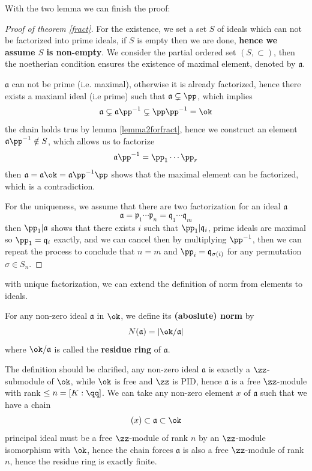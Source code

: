 With the two lemma we can finish the proof:
\begin{proof}[Proof of theorem \ref{fract}]
    For the existence, we set a set \(S\) of ideals which can not be factorized into prime ideals, if \(S\) is empty then we are done, \textbf{hence we assume \(S\) is non-empty}. We consider the partial ordered set \((S,\subset)\), then the noetherian condition ensures the existence of maximal element, denoted by \(\mathfrak{a}\).

    \(\mathfrak{a}\) can not be prime (i.e. maximal), otherwise it is already factorized, hence there exists a maxiaml ideal (i.e prime) such that \(\mathfrak{a} \subsetneq \pp\), which implies
    \[\mathfrak{a} \subsetneq \mathfrak{a}\pp^{-1} \subsetneq \pp\pp^{-1} = \ok \]
    the chain holds trus by lemma \ref{lemma2forfract}, hence we construct an element \(\mathfrak{a}\pp^{-1} \notin S\), which allows us to factorize
    \[\mathfrak{a}\pp^{-1} = \pp_1 \cdots \pp_r\]
    then \(\mathfrak{a} = \mathfrak{a}\ok = \mathfrak{a}\pp^{-1}\pp\) shows that the maximal element can be factorized, which is a contradiction.

    For the uniqueness, we assume that there are two factorization for an ideal \(\mathfrak{a}\)
    \[\mathfrak{a} = \mathfrak{p}_1\cdots \mathfrak{p}_n = \mathfrak{q}_1 \cdots \mathfrak{q}_m\] 
    then \(\pp_1 | \mathfrak{a}\) shows that there exists \(i\) such that \(\pp_1 | \mathfrak{q}_i\), prime ideals are maximal so \(\pp_1 = \mathfrak{q}_i\) exactly, and we can cancel then by multiplying \(\pp^{-1}\), then we can repeat the process to conclude that \(n=m\) and \(\pp_i = \mathfrak{q}_{\sigma(i)}\) for any permutation \(\sigma \in S_n\).
\end{proof}

with unique factorization, we can extend the definition of norm from elements to ideals.

\begin{colordefinition}
    For any non-zero ideal \(\mathfrak{a}\) in \(\ok\), we define its \textbf{(aboslute) norm} by
    \[N(\mathfrak{a}) = |\ok / \mathfrak{a}|\]
    where \(\ok/\mathfrak{a}\) is called the \textbf{residue ring} of \(\mathfrak{a}\). 
\end{colordefinition}

\begin{remark}
    The definition should be clarified, any non-zero ideal \(\mathfrak{a}\) is exactly a \(\zz\)-submodule of \(\ok\), while \(\ok\) is free and \(\zz\) is PID, hence \(\mathfrak{a}\) is a free \(\zz\)-module with rank \(\leq n = [K:\qq]\). We can take any non-zero element \(x\) of \(\mathfrak{a}\) such that we have a chain 
    \[(x) \subset \mathfrak{a} \subset \ok\]
    principal ideal must be a free \(\zz\)-module of rank \(n\) by an \(\zz\)-module isomorphism with \(\ok\), hence the chain forces \(\mathfrak{a}\) is also a free \(\zz\)-module of rank \(n\), hence the residue ring is exactly finite.
\end{remark}

